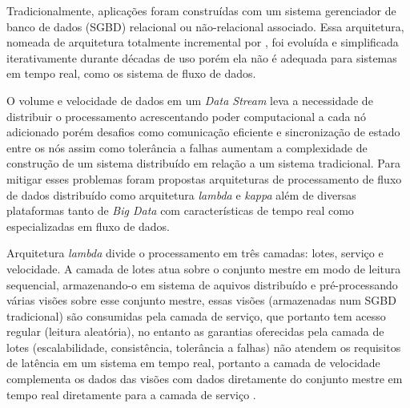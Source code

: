 


Tradicionalmente, aplicações foram construídas com um sistema gerenciador de
banco de dados (SGBD) relacional ou não-relacional associado. Essa arquitetura,
nomeada de arquitetura totalmente incremental por ,
foi evoluída e simplificada iterativamente durante décadas de uso porém ela não
é adequada para sistemas em tempo real, como os sistema de fluxo de dados.

O volume e velocidade de dados em um \emph{Data Stream} leva a necessidade de
distribuir o processamento acrescentando poder computacional a cada nó
adicionado porém desafios como comunicação eficiente e sincronização de estado
entre os nós assim como tolerância a falhas aumentam a complexidade de
construção de um sistema distribuído em relação a um sistema tradicional. Para
mitigar esses problemas foram propostas arquiteturas de processamento de fluxo
de dados distribuído como arquitetura \emph{lambda} e \emph{kappa} além de
diversas plataformas tanto de \emph{Big Data} com características de tempo real
como especializadas em fluxo de dados.

Arquitetura \emph{lambda} divide o processamento em três camadas: lotes, serviço
e velocidade. A camada de lotes atua sobre o conjunto mestre em modo de leitura
sequencial, armazenando-o em sistema de aquivos distribuído e pré-processando
várias visões sobre esse conjunto mestre, essas visões (armazenadas num SGBD
tradicional) são consumidas pela camada de serviço, que portanto tem acesso
regular (leitura aleatória), no entanto as garantias oferecidas pela camada de
lotes (escalabilidade, consistência, tolerância a falhas) não atendem os requisitos
de latência em um sistema em tempo real, portanto a camada de velocidade
complementa os dados das visões com dados diretamente do conjunto mestre em
tempo real diretamente para a camada de serviço \cite{marz2015big}.

